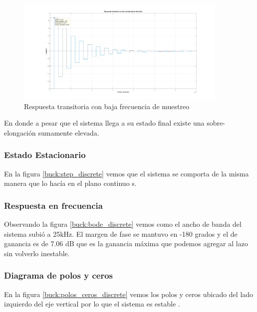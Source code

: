 \documentclass[12pt]{report}
\begin{document}
	\begin{figure}[H]
		\centering
		\includegraphics[width=0.9\textwidth,height=\textheight,keepaspectratio]{buck_step_low_freq}
		\caption{Respuesta transitoria con baja frecuencia de muestreo}
	\end{figure}

	En donde a pesar que el sistema llega a su estado final existe una sobre-elongación sumamente elevada.
	
	\subsubsection{Estado Estacionario}
	
	En la figura \ref{buck:step_discrete} vemos que el sistema se comporta de la misma manera que lo hacía en el plano continuo s.
	
	\subsubsection{Respuesta en frecuencia}
	
	Observando la figura \ref{buck:bode_discrete} vemos como el ancho de banda del sistema subió a 25kHz. El margen de fase se mantuvo en -180 grados y el de ganancia es de 7.06 dB que es la ganancia máxima que podemos agregar al lazo sin volverlo inestable.
	
	\subsubsection{Diagrama de polos y ceros}
	
	En la figura \ref{buck:polos_ceros_discrete} vemos los polos y ceros ubicado del lado izquierdo del eje vertical por lo que el sistema es estable .
	
\end{document}
